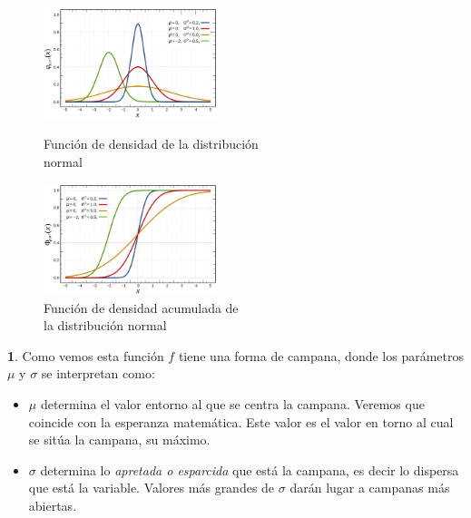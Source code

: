 \documentclass[]{book}
\theoremstyle{plain}
\theoremstyle{definition}
\theoremstyle{definition} %
\newcommand{\thistheoremname}{}
\newtheorem{genericthm}[theorem]{\thistheoremname}
\newenvironment{customdef}[1]
  {\renewcommand{\thistheoremname}{#1}%
   \begin{genericthm}}
  {\end{genericthm}}
\begin{document}
\begin{figure}[htbp]
  \begin{minipage}{0.5\linewidth}
  \centering
  \includegraphics[width=2in,height=\textheight]{img/normal1_new.png}
  \caption{Función de densidad de la distribución\\ normal}
  \end{minipage}%
  \begin{minipage}{0.5\linewidth}
  \centering
  \includegraphics[width=2in,height=\textheight]{img/normal2_new.png}
  \caption{Función de densidad acumulada de \\la distribución normal}
  \end{minipage}
\end{figure} 


\begin{customdef}{Interpretación de $\mu$ y $\sigma$}

Como vemos esta función \(f\) tiene una forma de campana, donde los
parámetros \(\mu\) y \(\sigma\) se interpretan como:

\begin{itemize}
\item
  \(\mu\) determina el valor entorno al que se centra la campana.
  Veremos que coincide con la esperanza matemática. Este valor es el valor en torno al cual se sitúa la campana, su máximo.
\item
  \(\sigma\) determina lo \emph{apretada o esparcida} que está la campana, es decir
  lo dispersa que está la variable. Valores más grandes de $\sigma$ darán lugar a campanas más abiertas.
\end{itemize}

\end{customdef}
\end{document}
